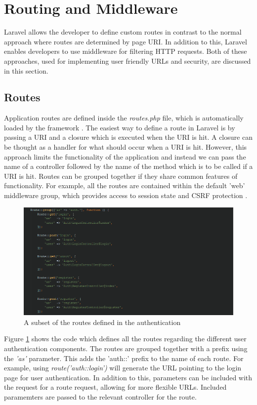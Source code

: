 \section{Routing and Middleware}
Laravel allows the developer to define custom routes in contrast to the normal approach where routes are determined by page URI. In addition to this, Laravel enables developers to use middleware for filtering HTTP requests. Both of these approaches, used for implementing user friendly URLs and security, are discussed in this section.

\subsection{Routes}
Application routes are defined inside the \textit{routes.php} file, which is automatically loaded by the framework \cite{Laravel:Routing}. The easiest way to define a route in Laravel is by passing a URI and a closure which is executed when the URI is hit. A closure can be thought as a handler for what should occur when a URI is hit. However, this approach limits the functionality of the application and instead we can pass the name of a controller followed by the name of the method which is to be called if a URI is hit. Routes can be grouped together if they share common features of functionality. For example, all the routes are contained within the default 'web' middleware group, which provides access to session state and CSRF protection \cite{Laravel:Routing}.

\begin{figure}[H]
	\centering
	\includegraphics[width=\textwidth]{Images/Implementation/LaravelRouting}
	\caption{A subset of the routes defined in the authentication} \label{fig:Routes}
\end{figure}

Figure \ref{fig:Routes} shows the code which defines all the routes regarding the different user authentication components. The routes are grouped together with a prefix using the \emph{'as'} parameter. This adds the 'auth::' prefix to the name of each route. For example, using \emph{route('auth::login')} will generate the URL pointing to the login page for user authentication. In addition to this, parameters can be included with the request for a route request, allowing for more flexible URLs. Included paramemters are passed to the relevant controller for the route. 

